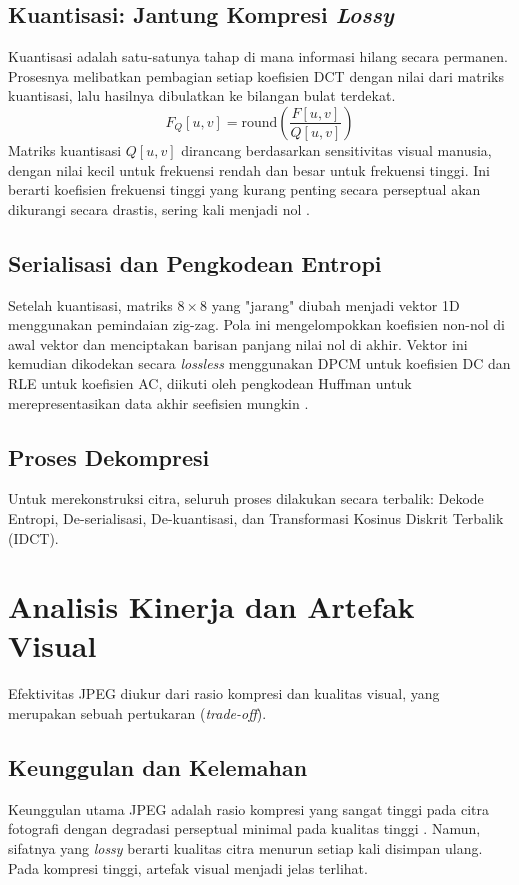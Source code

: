 \documentclass[a4paper]{article}
\begin{document}
\subsection{Kuantisasi: Jantung Kompresi \textit{Lossy}}
Kuantisasi adalah satu-satunya tahap di mana informasi hilang secara permanen. Prosesnya melibatkan pembagian setiap koefisien DCT dengan nilai dari matriks kuantisasi, lalu hasilnya dibulatkan ke bilangan bulat terdekat.
\begin{equation} \label{eq:quantization}
  F_Q[u, v] = \text{round}\left(\frac{F[u, v]}{Q[u, v]}\right)
\end{equation}
Matriks kuantisasi $Q[u,v]$ dirancang berdasarkan sensitivitas visual manusia, dengan nilai kecil untuk frekuensi rendah dan besar untuk frekuensi tinggi. Ini berarti koefisien frekuensi tinggi yang kurang penting secara perseptual akan dikurangi secara drastis, sering kali menjadi nol \cite{wallace1991jpeg}.

\subsection{Serialisasi dan Pengkodean Entropi}
Setelah kuantisasi, matriks $8 \times 8$ yang "jarang" diubah menjadi vektor 1D menggunakan pemindaian zig-zag. Pola ini mengelompokkan koefisien non-nol di awal vektor dan menciptakan barisan panjang nilai nol di akhir. Vektor ini kemudian dikodekan secara \textit{lossless} menggunakan DPCM untuk koefisien DC dan RLE untuk koefisien AC, diikuti oleh pengkodean Huffman untuk merepresentasikan data akhir seefisien mungkin \cite{wallace1991jpeg}.

\subsection{Proses Dekompresi}
Untuk merekonstruksi citra, seluruh proses dilakukan secara terbalik: Dekode Entropi, De-serialisasi, De-kuantisasi, dan Transformasi Kosinus Diskrit Terbalik (IDCT).

\section{Analisis Kinerja dan Artefak Visual}
Efektivitas JPEG diukur dari rasio kompresi dan kualitas visual, yang merupakan sebuah pertukaran (\textit{trade-off}).

\subsection{Keunggulan dan Kelemahan}
Keunggulan utama JPEG adalah rasio kompresi yang sangat tinggi pada citra fotografi dengan degradasi perseptual minimal pada kualitas tinggi \cite{wallace1991jpeg}. Namun, sifatnya yang \textit{lossy} berarti kualitas citra menurun setiap kali disimpan ulang. Pada kompresi tinggi, artefak visual menjadi jelas terlihat.
\end{document}
